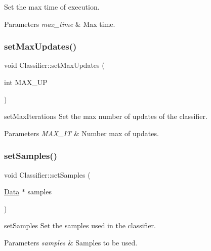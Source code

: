 Set the max time of execution. 


\begin{DoxyParams}{Parameters}
{\em max\+\_\+time} & Max time. \\
\hline
\end{DoxyParams}
\mbox{\label{class_classifier_ad8930d5e6002299bdb840d4542229f02}} 
\subsubsection{\texorpdfstring{set\+Max\+Updates()}{setMaxUpdates()}}
{\footnotesize\ttfamily void Classifier\+::set\+Max\+Updates (\begin{DoxyParamCaption}\item[{int}]{M\+A\+X\+\_\+\+UP }\end{DoxyParamCaption})}



set\+Max\+Iterations Set the max number of updates of the classifier. 


\begin{DoxyParams}{Parameters}
{\em M\+A\+X\+\_\+\+IT} & Number max of updates. \\
\hline
\end{DoxyParams}
\mbox{\label{class_classifier_a4b16736670cba8f4c8397b6a90c8c799}} 
\subsubsection{\texorpdfstring{set\+Samples()}{setSamples()}}
{\footnotesize\ttfamily void Classifier\+::set\+Samples (\begin{DoxyParamCaption}\item[{\hyperlink{class_data}{Data} $\ast$}]{samples }\end{DoxyParamCaption})\hspace{0.3cm}{\ttfamily [virtual]}}



set\+Samples Set the samples used in the classifier. 


\begin{DoxyParams}{Parameters}
{\em samples} & Samples to be used. \\
\hline
\end{DoxyParams}
\mbox{\label{class_classifier_aef6cb633eed60712f8948a404f630e82}} 

